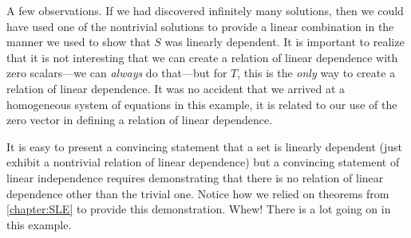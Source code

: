 \documentclass{ximera}
\begin{document}
\begin{example}
  A few observations.  If we had discovered infinitely many solutions,
  then we could have used one of the nontrivial solutions to provide a
  linear combination in the manner we used to show that $S$ was
  linearly dependent.  It is important to realize that it is not
  interesting that we can create a relation of linear dependence with
  zero scalars---we can \textit{always} do that---but for $T$, this is
  the \textit{only} way to create a relation of linear dependence.  It
  was no accident that we arrived at a homogeneous system of equations
  in this example, it is related to our use of the zero vector in
  defining a relation of linear dependence.

  It is easy to present a convincing statement that a set is linearly
  dependent (just exhibit a nontrivial relation of linear dependence)
  but a convincing statement of linear independence requires
  demonstrating that there is no relation of linear dependence other
  than the trivial one.  Notice how we relied on theorems from
  \ref{chapter:SLE} to provide this demonstration.  Whew!  There is a
  lot going on in this example.
\end{example}
\end{document}

